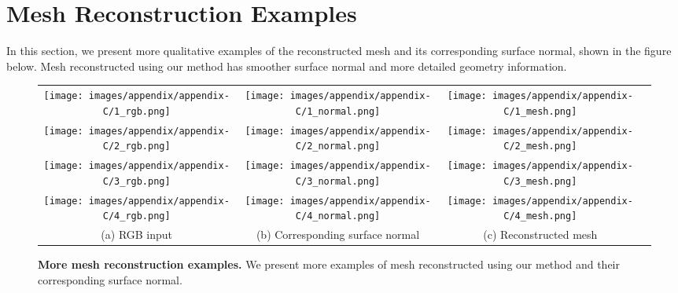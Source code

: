 \chapter{Mesh Reconstruction Examples}
\label{apd:C}
In this section, we present more qualitative examples of the reconstructed mesh and its corresponding surface normal, shown in the figure below. Mesh reconstructed using our method has smoother surface normal and more detailed geometry information.

\begin{figure}[h!]
\centering
\begin{tabular}{@{}c@{\hspace{1mm}}c@{\hspace{1mm}}c@{\hspace{1mm}}c@{}}
\texttt{[image: images/appendix/appendix-C/1\_rgb.png]}  &
\texttt{[image: images/appendix/appendix-C/1\_normal.png]}  &
\texttt{[image: images/appendix/appendix-C/1\_mesh.png]} \\
\texttt{[image: images/appendix/appendix-C/2\_rgb.png]}  &
\texttt{[image: images/appendix/appendix-C/2\_normal.png]}  &
\texttt{[image: images/appendix/appendix-C/2\_mesh.png]} \\
\texttt{[image: images/appendix/appendix-C/3\_rgb.png]}  &
\texttt{[image: images/appendix/appendix-C/3\_normal.png]}  &
\texttt{[image: images/appendix/appendix-C/3\_mesh.png]} \\
\texttt{[image: images/appendix/appendix-C/4\_rgb.png]}  &
\texttt{[image: images/appendix/appendix-C/4\_normal.png]}  &
\texttt{[image: images/appendix/appendix-C/4\_mesh.png]} \\
\small (a) RGB input & \small(b) Corresponding surface normal & \small (c) Reconstructed mesh  \\
\end{tabular}
    \caption{\textbf{More mesh reconstruction examples.} We present more examples of mesh reconstructed using our method and their corresponding surface normal.}
    \label{fig:more_normal_comparison}
\end{figure}

